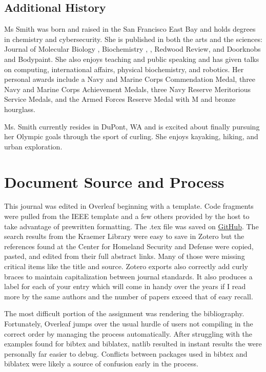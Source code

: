 \documentclass[journal]{IEEEtran}
\begin{document}
\subsection{Additional History}
Ms Smith was born and raised in the San Francisco East Bay and holds degrees in chemistry and cybersecurity. She is published in both the arts and the sciences: Journal of Molecular Biology \cite{JSmith3}, Biochemistry \cite{JSmith1}, \cite{JSmith2}, Redwood Review, and Doorknobs and Bodypaint. She also enjoys teaching and public speaking and has given talks on computing, international affairs, physical biochemistry, and robotics. Her personal awards include a Navy and Marine Corps Commendation Medal, three Navy and Marine Corps Achievement Medals, three Navy Reserve Meritorious Service Medals, and the Armed Forces Reserve Medal with M and bronze hourglass.

Ms. Smith currently resides in DuPont, WA and is excited about finally pursuing her Olympic goals through the sport of curling. She enjoys kayaking, hiking, and urban exploration.
\section{Document Source and Process}
This journal was edited in Overleaf beginning with a template. Code fragments were pulled from the IEEE template and a few others provided by the host to take advantage of prewritten formatting. The .tex file was saved on \href{https://github.com/morisey/UCCS/blob/master/Journal1.tex}{GitHub}. The search results from the Kraemer Library were easy to save in Zotero but the references found at the Center for Homeland Security and Defense were copied, pasted, and edited from their full abstract links. Many of those were missing critical items like the title and source. Zotero exports also correctly add curly braces to maintain capitalization between journal standards. It also produces a label for each of your entry which will come in handy over the years if I read more by the same authors and the number of papers exceed that of easy recall.

The most difficult portion of the assignment was rendering the bibliography. Fortunately, Overleaf jumps over the usual hurdle of users not compiling in the correct order by managing the process automatically. After struggling with the examples found for bibtex and biblatex, natlib resulted in instant results the were personally far easier to debug. Conflicts between packages used in bibtex and biblatex were likely a source of confusion early in the process.
\end{document}
